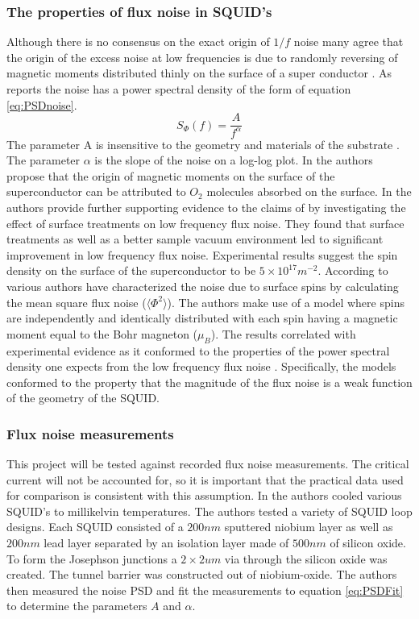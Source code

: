 \subsubsection*{The properties of flux noise in SQUID's}
Although there is no consensus on the exact origin of $1/f$ noise many agree that the origin of the excess noise at low frequencies is due to randomly reversing of magnetic moments distributed thinly on the surface of a super conductor \cite{FluxNoiseCol}. As \cite{FluxNoiseCol} reports the noise has a power spectral density of the form of equation \ref{eq:PSDnoise}.
\begin{equation}
    S_\Phi(f) = \frac{A}{f^\alpha}
    \label{eq:PSDnoise}
\end{equation}
The parameter A is insensitive to the geometry and materials of the substrate \cite{fluxNoiseSquidsStevenAnton}. The parameter $\alpha$ is the slope of the noise on a log-log plot. In \cite{SurfaceSpinOrig} the authors propose that the origin of magnetic moments on the surface of the superconductor can be attributed to $O_2$ molecules absorbed on the surface. In \cite{OriginAndReductionOf1/fNoise} the authors provide further supporting evidence to the claims of \cite{SurfaceSpinOrig} by investigating the effect of surface treatments on low frequency flux noise. They found that surface treatments as well as a better sample vacuum environment led to significant improvement in low frequency flux noise. Experimental results suggest the spin density on the surface of the superconductor to be $5\times10^{17}m^{-2}$. According to \cite{fluxNoiseSquidsStevenAnton} various authors have characterized the noise due to surface spins by calculating the mean square flux noise ($\langle \Phi^2\rangle $). The authors make use of a model where spins are independently and identically distributed with each spin having a magnetic moment equal to the Bohr magneton ($\mu_B$). The results correlated with experimental evidence as it conformed to the properties of the power spectral density one expects from the low frequency flux noise \cite{fluxNoiseSquidsStevenAnton}. Specifically, the models conformed to the property that the magnitude of the flux noise is a weak function of the geometry of the SQUID.

\subsubsection*{Flux noise measurements}
This project will be tested against recorded flux noise measurements. The critical current will not be accounted for, so it is important that the practical data used for comparison is consistent with this assumption. In \cite{FluxNoiseCol} the authors cooled various SQUID's to millikelvin temperatures. The authors tested a variety of SQUID loop designs. Each SQUID consisted of a $200 nm$ sputtered niobium layer as well as $200nm$ lead layer separated by an isolation layer made of $500nm$ of silicon oxide. To form the Josephson junctions a $2\times 2 um$ via through the silicon oxide was created. The tunnel barrier was constructed out of niobium-oxide. The authors then measured the noise PSD and fit the measurements to equation \ref{eq:PSDFit} to determine the parameters $A$ and $\alpha$.

